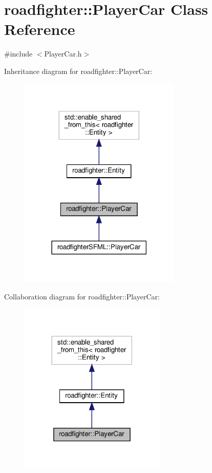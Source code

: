 \hypertarget{classroadfighter_1_1PlayerCar}{}\section{roadfighter\+:\+:Player\+Car Class Reference}
\label{classroadfighter_1_1PlayerCar}


{\ttfamily \#include $<$Player\+Car.\+h$>$}



Inheritance diagram for roadfighter\+:\+:Player\+Car\+:\nopagebreak
\begin{figure}[H]
\begin{center}
\leavevmode
\includegraphics[width=218pt]{classroadfighter_1_1PlayerCar__inherit__graph}
\end{center}
\end{figure}


Collaboration diagram for roadfighter\+:\+:Player\+Car\+:\nopagebreak
\begin{figure}[H]
\begin{center}
\leavevmode
\includegraphics[width=197pt]{classroadfighter_1_1PlayerCar__coll__graph}
\end{center}
\end{figure}
